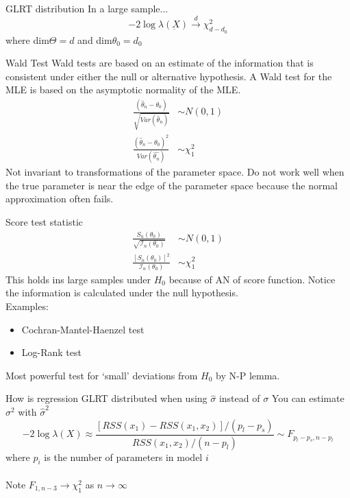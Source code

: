 \documentclass[avery5388,grid,frame]{flashcards}
\begin{document}
\begin{flashcard}{GLRT distribution}
\bigskip\bigskip\bigskip
In a large sample...
\begin{equation*}
-2\log\lambda(\underbar{X})\overset{d}{\rightarrow}\chi^2_{d-d_0}
\end{equation*}
where dim$\Theta=d$ and dim$\theta_0=d_0$
\end{flashcard}
\begin{flashcard}[Definition]{Wald Test}
\bigskip\bigskip\bigskip
Wald tests are based on an estimate of the information that is consistent under either the null or alternative hypothesis. A Wald test for the MLE is based on the asymptotic normality of the MLE.
{\begin{align*}
\frac{(\hat{\theta}_n-\theta_0)}{\sqrt{Var(\hat{\theta}_n)}}&\sim N(0,1)\\
\frac{(\hat{\theta}_n-\theta_0)^2}{Var(\hat{\theta_n})}&\sim\chi^2_1
\end{align*}}
Not invariant to transformations of the parameter space. Do not work well when the true parameter is near the edge of the parameter space because the normal approximation often fails.
\end{flashcard}
\begin{flashcard}[Definition]{Score test statistic}
\bigskip
{\begin{align*}
\frac{S_n(\theta_0)}{\sqrt{\mathcal{I}_n(\theta_0)}}&\sim N(0,1)\\
\frac{[S_n(\theta_0)]^2}{\mathcal{I}_n(\theta_0)}&\sim\chi^2_1
\end{align*}}
This holds ins large samples under $H_0$ because of AN of score function. Notice the information is calculated under the null hypothesis. \\Examples:
\begin{itemize}
\item Cochran-Mantel-Haenzel test
\item Log-Rank test
\end{itemize}
Most powerful test for `small' deviations from $H_0$ by N-P lemma.
\end{flashcard}
\begin{flashcard}[Definition]{How is regression GLRT distributed when using $\hat{\sigma}$ instead of $\sigma$}
\bigskip
You can estimate $\sigma^2$ with $\hat{\sigma}^2$
\begin{equation*}
-2\log\lambda(X)\approx\frac{[RSS(x_1)-RSS(x_1,x_2)]/(p_l-p_s)}{RSS(x_1,x_2)/(n-p_l)}\sim F_{p_l-p_s,n-p_l}
\end{equation*}
where $p_i$ is the number of parameters in model $i$\\\\
Note $F_{1,n-3}\rightarrow\chi^2_1$ as $n\rightarrow\infty$
\end{flashcard}
\end{document}
